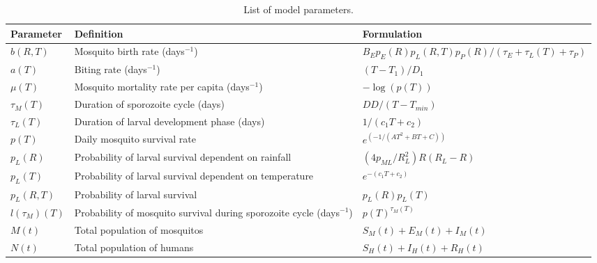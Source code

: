 \documentclass[a4paper,fleqn]{cas-dc}
\begin{document}
\begin{table}[width=2.0\linewidth,cols=3,pos=h]
\caption{List of model parameters.}\label{tbl1}
\renewcommand{\thetable}{Appendix 1}  %
\begin{tabular*}{\tblwidth}{@{} LLL@{} }
\toprule
Parameter & Definition & Formulation\\
\midrule
$b(R, T)$   & Mosquito birth rate (days$^{-1}$)   & ${B_E  p_E(R)  p_L(R,T)  p_P(R)}/{(\tau_E + \tau_L(T) + \tau_P)}$   \\ 
$a(T)$   & Biting rate (days$^{-1}$)  & ${(T - T_1)}/{D_1}$   \\ 
$\mu(T)$   & Mosquito mortality rate per capita (days$^{-1}$)   & $-\log(p(T))$  \\ 
$\tau_M(T)$   & Duration of sporozoite cycle (days)   & ${DD}/{(T - T_{min})}$   \\ 
$\tau_L(T)$   & Duration of larval development phase (days)   & ${1}/{(c_1T + c_2)}$  \\ 
$p(T)$   & Daily mosquito survival rate   & $e^{(-1 / (AT^2 + BT + C))}$ \\  
$p_L(R)$   & Probability of larval survival dependent on rainfall   & $({4p_{ML}}/{R_L^2})R(R_L - R)$  \\  
$p_L(T)$   & Probability of larval survival dependent on temperature   & $e^{-(c_1T + c_2)}$  \\ 
$p_L(R, T)$   &Probability of larval survival   & $p_L(R)p_L(T)$   \\  
$l({\tau_M})(T)$   &  Probability of mosquito survival during sporozoite cycle (days$^{-1}$)  & $p(T)^{\tau_M(T)}$  \\ 
$M(t)$   &  Total population of mosquitos  & $S_M(t) + E_M(t) + I_M(t)$   \\ 
$N(t)$   & Total population of humans   & $S_H(t) + I_H(t) + R_H(t)$   \\ 
\bottomrule
\end{tabular*}
\end{table}

\end{document}
